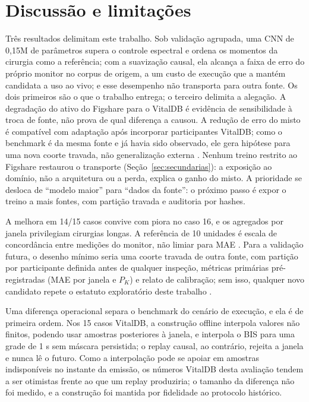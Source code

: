 \documentclass[12pt]{article}
\begin{document}
\section{Discussão e limitações}

Três resultados delimitam este trabalho. Sob validação agrupada, uma CNN de 0,15M de parâmetros supera o controle espectral e ordena os momentos da cirurgia como a referência; com a suavização causal, ela alcança a faixa de erro do próprio monitor no corpus de origem, a um custo de execução que a mantém candidata a uso ao vivo; e esse desempenho não transporta para outra fonte. Os dois primeiros são o que o trabalho entrega; o terceiro delimita a alegação. A degradação do ativo do Figshare para o VitalDB é evidência de sensibilidade à troca de fonte, não prova de qual diferença a causou. A redução de erro do misto é compatível com adaptação após incorporar participantes VitalDB; como o benchmark é da mesma fonte e já havia sido observado, ele gera hipótese para uma nova coorte travada, não generalização externa \cite{lee2022,tripodai,imdrfn88}. Nenhum treino restrito ao Figshare restaurou o transporte (Seção~\ref{sec:secundarias}): a exposição ao domínio, não a arquitetura ou a perda, explica o ganho do misto. A prioridade se desloca de ``modelo maior'' para ``dados da fonte'': o próximo passo é expor o treino a mais fontes, com partição travada e auditoria por hashes.

A melhora em 14/15 casos convive com piora no caso 16, e os agregados por janela privilegiam cirurgias longas. A referência de 10 unidades é escala de concordância entre medições do monitor, não limiar para MAE \cite{harada2021}. Para a validação futura, o desenho mínimo seria uma coorte travada de outra fonte, com partição por participante definida antes de qualquer inspeção, métricas primárias pré-registradas (MAE por janela e $P_K$) e relato de calibração; sem isso, qualquer novo candidato repete o estatuto exploratório deste trabalho \cite{tripodai,archer2021}.

Uma diferença operacional separa o benchmark do cenário de execução, e ela é de primeira ordem. Nos 15 casos VitalDB, a construção offline interpola valores não finitos, podendo usar amostras posteriores à janela, e interpola o BIS para uma grade de 1 s sem máscara persistida; o replay causal, ao contrário, rejeita a janela e nunca lê o futuro. Como a interpolação pode se apoiar em amostras indisponíveis no instante da emissão, os números VitalDB desta avaliação tendem a ser otimistas frente ao que um replay produziria; o tamanho da diferença não foi medido, e a construção foi mantida por fidelidade ao protocolo histórico.
\end{document}
